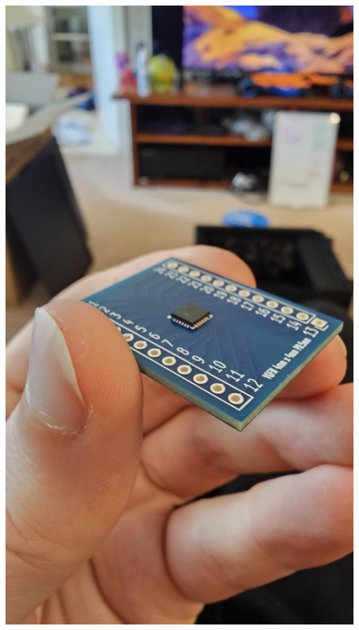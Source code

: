 \documentclass[11pt,a4paper,titlepage]{report}
\begin{document}
	\begin{center}
		\label{picture:images_mcu_soldered_1}
		\includegraphics[width=\linewidth]{assets/MCU_SOLDERED1.jpg}
	\end{center}
\end{document}
